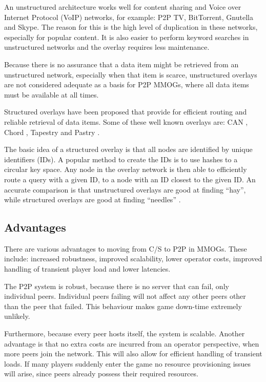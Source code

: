 \documentclass[10pt,a4paper,journal,cspaper,compsoc]{IEEEtran}
\begin{document}
An unstructured architecture works well for content sharing and Voice over Internet Protocol (VoIP) networks, for example: P2P TV, BitTorrent,
Gnutella and Skype. The reason for this is the high level of duplication in these networks, especially for popular content. It is also easier to
perform keyword searches in unstructured networks and the overlay requires less maintenance.

Because there is no assurance that a data item might be retrieved from an unstructured network, especially when that item is scarce, unstructured
overlays are not considered adequate as a basis for P2P MMOGs, where all data items must be available at all times.

Structured overlays have been proposed that provide for efficient routing and reliable retrieval of data items. Some of these well known overlays
are: CAN \cite{CAN}, Chord \cite{chord}, Tapestry \cite{tapestry} and Pastry \cite{pastry}.

The basic idea of a structured overlay is that all nodes are identified by unique identifiers (IDs). A popular method to create the IDs is to use
hashes to a circular key space. Any node in the overlay network is then able to efficiently route a query with a given ID, to a node with an ID
closest to the given ID. An accurate comparison is that unstructured overlays are good at finding ``hay'', while structured overlays are good at
finding ``needles'' \cite{Rodrigues_acm_comms_p2p}.


\subsection{Advantages}
\label{p2p_advantages}

There are various advantages to moving from C/S to P2P in MMOGs. These include: increased robustness, improved scalability, lower operator costs,
improved handling of transient player load and lower latencies.

The P2P system is robust, because there is no server that can fail, only individual peers. Individual peers failing will not affect any other peers
other than the peer that failed. This behaviour makes game down-time extremely unlikely.

Furthermore, because every peer hosts itself, the system is scalable. Another advantage is that no extra costs are incurred from an operator
perspective, when more peers join the network. This will also allow for efficient handling of transient loads. If many players suddenly enter the
game no resource provisioning issues will arise, since peers already possess their required resources.
\end{document}
